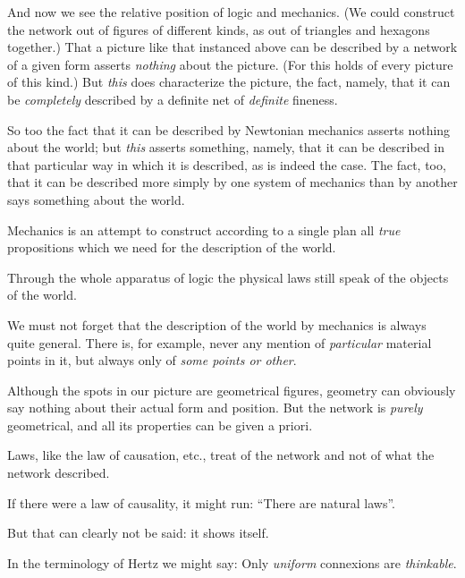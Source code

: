 {And now we see the relative position of logic
and mechanics. (We could construct the network
out of figures of different kinds, as out of
triangles and hexagons together.) That a picture
like that instanced above can be described by a
network of a given form asserts \emph{nothing} about
the picture. (For this holds of every picture of
this kind.) But \emph{this} does characterize the picture,
the fact, namely, that it can be \emph{completely} described
by a definite net of \emph{definite} fineness.

So too the fact that it can be described by
Newtonian mechanics asserts nothing about the
world; but \emph{this} asserts something, namely, that
it can be described in that particular way in which
it is described, as is indeed the case. The fact,
too, that it can be described more simply by one
system of mechanics than by another says something
about the world.}


{Mechanics is an attempt to construct according
to a single plan all \emph{true} propositions which we
need for the description of the world.}


{Through the whole apparatus of logic the
physical laws still speak of the objects of the
world.}


{We must not forget that the description of the
world by mechanics is always quite general.
There is, for example, never any mention of
\emph{particular} material points in it, but always only
of \emph{some points or other}.}


{Although the spots in our picture are geometrical
figures, geometry can obviously say nothing
about their actual form and position. But the
network is \emph{purely} geometrical, and all its properties
can be given a priori.

Laws, like the law of causation, etc., treat
of the network and not of what the network
described.}


{If there were a law of causality, it might run:
``There are natural laws''.

But that can clearly not be said: it shows
itself.}


{In the terminology of Hertz we might say:
Only \emph{uniform} connexions are \emph{thinkable}.}


